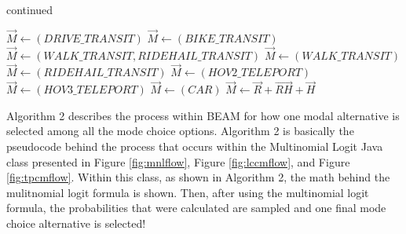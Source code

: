 \documentclass[12pt, oneside, openright]{byuthesis}
\begin{document}
\addtocounter{algorithm}{-1}
\begin{algorithm}
\caption{continued}
\begin{algorithmic} [1]
      \State $\vec{M} \gets (DRIVE\_TRANSIT)$
    \Else
      \State $\vec{M} \gets (BIKE\_TRANSIT)$
    \EndIf  
  \Else
    \State $\vec{M} \gets (WALK\_TRANSIT, RIDEHAIL\_TRANSIT)$
  \EndIf
{}  
    \State $\vec{M} \gets (WALK\_TRANSIT)$
  \Else
    \State $\vec{M} \gets (RIDEHAIL\_TRANSIT)$
  \EndIf
{}  
    \State $\vec{M} \gets (HOV2\_TELEPORT)$
  \Else
    \State $\vec{M} \gets (HOV3\_TELEPORT)$
  \EndIf
{}
  \State $\vec{M} \gets (CAR)$
\Else
  \State $\vec{M} \gets \vec{R} + \vec{RH} + \vec{H}$  
\EndIf  
\EndProcedure
\EndFor
\EndFor
\Statex
\end{algorithmic}
\end{algorithm}

Algorithm 2 describes the process within BEAM for how one modal alternative is selected among all the mode choice options. Algorithm 2 is basically the pseudocode behind the process that occurs within the Multinomial Logit Java class presented in Figure \ref{fig:mnlflow}, Figure \ref{fig:lccmflow}, and Figure \ref{fig:tpcmflow}. Within this class, as shown in Algorithm 2, the math behind the mulitnomial logit formula is shown. Then, after using the multinomial logit formula, the probabilities that were calculated are sampled and one final mode choice alternative is selected!
\end{document}
